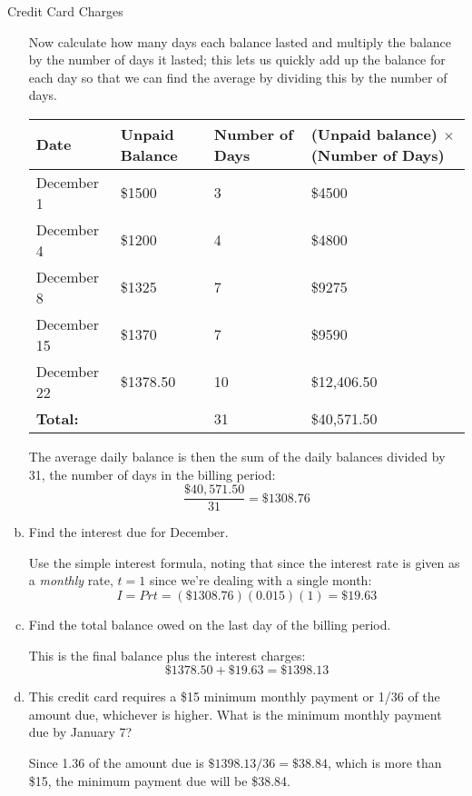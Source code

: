\begin{example}[https://www.youtube.com/watch?v=ZUEQu_e2TqY]{Credit Card Charges}
\begin{enumerate}[(a)]
Now calculate how many days each balance lasted and multiply the balance by the number of days it lasted; this lets us quickly add up the balance for each day so that we can find the average by dividing this by the number of days.
\begin{center}
\begin{tabular}{l l p{0.7in} p{1.5in}}
Date & Unpaid Balance & Number of Days & (Unpaid balance) $\times$ (Number of Days)\\
\hline
December 1 & \$1500 & 3 & \$4500\\
December 4 & \$1200 & 4 & \$4800\\
December 8 & \$1325 & 7 & \$9275\\
December 15 & \$1370 & 7 & \$9590\\
December 22 & \$1378.50 & 10 & \$12,406.50\\
\hline
\textbf{Total:} & & 31 & \$40,571.50
\end{tabular}
\end{center}

The average daily balance is then the sum of the daily balances divided by 31, the number of days in the billing period:
\[\dfrac{\$40,571.50}{31} = \$1308.76\]

\item Find the interest due for December.

Use the simple interest formula, noting that since the interest rate is given as a \textit{monthly} rate, $t=1$ since we're dealing with a single month:
\[I=Prt = (\$1308.76)(0.015)(1) = \$19.63\]

\item Find the total balance owed on the last day of the billing period.

This is the final balance plus the interest charges:
\[\$1378.50 + \$19.63 = \$1398.13\]

\item This credit card requires a \$15 minimum monthly payment or 1/36 of the amount due, whichever is higher.  What is the minimum monthly payment due by January 7?

Since 1.36 of the amount due is $\$1398.13/36 = \$38.84$, which is more than \$15, the minimum payment due will be \$38.84.
\end{enumerate}
\end{example}


